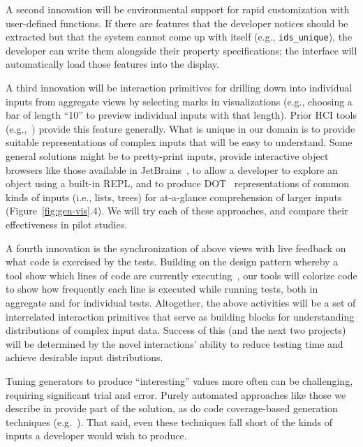 A second innovation will be environmental support for rapid customization with 
user-defined functions.  If
there are features that the developer notices should be extracted but that the
system cannot come up with itself (e.g., \lstinline{ids_unique}), the developer 
can
write them alongside their property specifications;
the interface will automatically load those features into the
display.

A third innovation will be interaction primitives for drilling down into
individual inputs from aggregate views by selecting marks in visualizations 
(e.g., choosing a bar
of length ``10'' to preview individual inputs with that length). Prior HCI tools 
(e.g.,~\cite{ref:hohman2019gamut})
provide this feature generally. What is unique in our domain is to provide 
suitable representations of complex inputs that
will be easy to understand. Some general solutions might be to
pretty-print inputs, provide interactive object browsers like those available
in JetBrains~\cite{tool:jetbrains}, to allow a developer to explore an
object using a built-in REPL, and to produce
DOT~\cite{ellson_graphviz_2002} representations of common kinds of
inputs (i.e., lists, trees) for at-a-glance comprehension of
larger inputs (Figure~\ref{fig:gen-vis}.4). We will try each of these
approaches, and compare their effectiveness in pilot studies.

A fourth innovation is the synchronization of above views with
live feedback on what code is exercised by the tests. Building on the design 
pattern whereby a tool show which lines of code are currently
executing~\cite{ref:brandt2010rehearse,
  ref:oney2009firecrystal, ref:burg2013record}, our tools will
colorize code to show
how frequently each line is executed while running tests, both in aggregate and 
for individual tests. Altogether, the above activities will be a set of 
interrelated interaction primitives that serve as building blocks for
understanding distributions of complex input data. Success of this (and the next 
two projects) will be determined by the novel interactions' ability to reduce 
testing time and achieve desirable input distributions.


%
Tuning generators to produce ``interesting''
values more often can be challenging, requiring
significant trial and error. Purely automated approaches
like those we describe in  provide part of the 
solution, as do code coverage-based generation techniques 
(e.g.~\cite{afl-readme}). That said,
even these techniques fall short of the kinds of inputs a developer would wish 
to produce.

